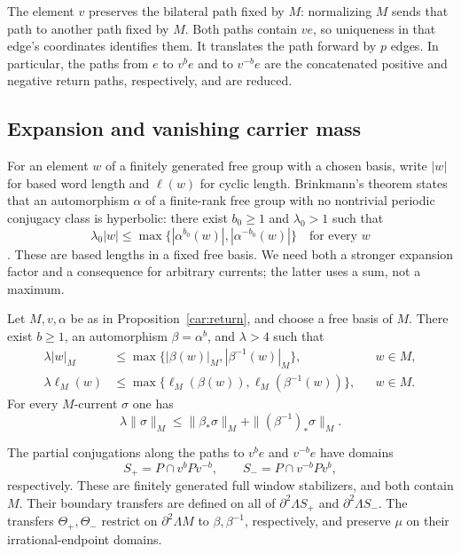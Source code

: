 The element $v$ preserves the bilateral path fixed by $M$:
normalizing $M$ sends that path to another path fixed by $M$.
Both paths contain $ve$, so uniqueness in that edge's coordinates
identifies them.  It translates the path forward by $p$
edges.  In particular, the paths from $e$ to $v^be$ and to
$v^{-b}e$ are the concatenated positive and negative return
paths, respectively, and are reduced.

\subsection{Expansion and vanishing carrier mass}

For an element $w$ of a finitely generated free group with a chosen
basis, write $|w|$ for based word length and $\ell(w)$ for cyclic
length.  Brinkmann's theorem states that an automorphism $\alpha$
of a finite-rank free group with no nontrivial periodic conjugacy
class is hyperbolic: there exist $b_0\ge1$ and $\lambda_0>1$ such
that
\[
 \lambda_0|w|
 \le\max\{|\alpha^{b_0}(w)|,|\alpha^{-b_0}(w)|\}
 \quad\text{for every }w
\]
\cite[Theorem~1.1 and the definition of a hyperbolic
automorphism]{Brinkmann2000HyperbolicAutomorphisms}.  These are based lengths in a fixed
free basis.  We need both a stronger expansion factor and a
consequence for arbitrary currents; the latter uses a sum, not
a maximum.

\begin{lemma}
\label{car:expansion}
Let $M,v,\alpha$ be as in Proposition~\ref{car:return}, and choose
a free basis of $M$.  There exist $b\ge1$, an automorphism
$\beta=\alpha^b$, and $\lambda>4$ such that
\begin{align}
 \lambda|w|_M
 &\le\max\{|\beta(w)|_M,|\beta^{-1}(w)|_M\},
 &&w\in M,                                      \label{car:based}\\
 \lambda\ell_M(w)
 &\le\max\{\ell_M(\beta(w)),\ell_M(\beta^{-1}(w))\},
 &&w\in M.                                      \label{car:cyclic}
\end{align}
For every $M$-current $\sigma$ one has
\begin{equation}
 \lambda\|\sigma\|_M
 \le\|\beta_*\sigma\|_M+
       \|(\beta^{-1})_*\sigma\|_M.
 \label{car:current}
\end{equation}

The partial conjugations along the paths to $v^be$ and $v^{-b}e$
have domains
\[
 S_+=P\cap v^bPv^{-b},\qquad
 S_-=P\cap v^{-b}Pv^b,
\]
respectively.  These are finitely generated full window stabilizers,
and both contain $M$.  Their boundary transfers are defined on all
of $\partial^2\Lambda S_+$ and $\partial^2\Lambda S_-$.
The transfers $\Theta_+,\Theta_-$ restrict on $\partial^2\Lambda M$ to
$\beta,\beta^{-1}$, respectively, and preserve $\mu$ on their
irrational-endpoint domains.
\end{lemma}

